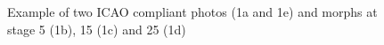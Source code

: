 \begin{figure}
	\label{1c}\hfill
	\label{1d}\hfill
	\label{1e} 
	\caption{Example of two ICAO compliant photos (1a and 1e) and morphs at stage 5 (1b), 15 (1c) and 25 (1d)}
	\label{fig1} 
\end{figure}

